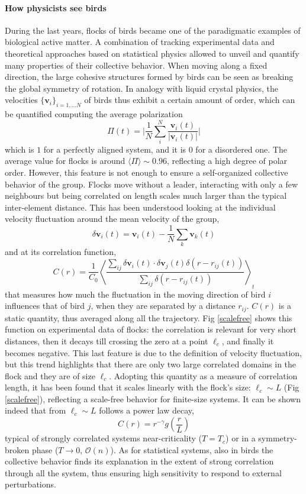 \paragraph*{How physicists see birds}
During the last years, flocks of birds became one of the paradigmatic examples of biological active matter. A combination of tracking experimental data and theoretical approaches based on statistical physics allowed to unveil and quantify many properties of their collective behavior. When moving along a fixed direction, 
the large cohesive structures formed by birds can be seen as breaking the global symmetry of rotation.
In analogy with liquid crystal physics, the velocities $\{\bm v_i\}_{i = 1,...N}$ of birds 
thus exhibit a certain amount of order,
which can be quantified computing the average polarization
\begin{equation}
\Pi(t) = \Big | \frac{1}{N} \sum_{i}^N \frac{\bm v_i(t)}{|\bm v_i(t)|} \Big |
\end{equation}
which is $1$ for a perfectly aligned system, and it is $0$ for a disordered one.
The average value for flocks is around $\langle \Pi \rangle \sim 0.96$, reflecting a high degree of polar order. However, this feature is not enough to ensure a self-organized collective behavior of the group. Flocks move without a leader, interacting with only a few neighbours but being correlated on length scales much larger than the typical inter-element distance. This has been understood looking at the individual velocity fluctuation around the mean velocity of the group,
$$
\delta \bm v_i (t) = \bm v_i(t) - \frac{1}{N} \sum_k \bm v_k(t)
$$
and at its correlation function,
\begin{equation}
 C(r) = \frac{1}{C_0} \left\langle \frac{\sum_{ij} \delta \bm v_i(t) \cdot \delta \bm v_j(t) \delta(r-r_{ij}(t))}{\sum_{ij} \delta(r-r_{ij}(t))} \right\rangle_t
\end{equation}
that measures how much the fluctuation in the moving direction of bird $i$ influences that of bird $j$, when they are separated by a distance $r_{ij}$. $C(r)$ is a static quantity, thus averaged along all the trajectory. Fig \ref{scalefree} shows this function on experimental data of flocks: the correlation is relevant for very short distances, then it decays till crossing the zero at a point $\ell_c$, and finally it becomes negative. This last feature is due to the definition of velocity fluctuation, but this trend highlights that there are only two large correlated domains in the flock and they are of size $\ell_c$. Adopting this quantity as a measure of correlation length, it has been found that it scales linearly with the flock's size: $\ell_c \sim L$ (Fig \ref{scalefree}), reflecting a scale-free behavior for finite-size systems. It can be shown indeed that from $\ell_c \sim L$ follows a power law decay,
$$
C(r) = r^{-\gamma} g \left( \frac{r}{L}\right)
$$
typical of strongly correlated systems near-criticality ($T=T_c$) or in a symmetry-broken phase ($T\to 0$, $\mathcal O(n)$).
As for statistical systems, also in birds the collective behavior finds its explanation in the extent of strong correlation through all the system, thus ensuring high sensitivity to respond to external perturbations.

